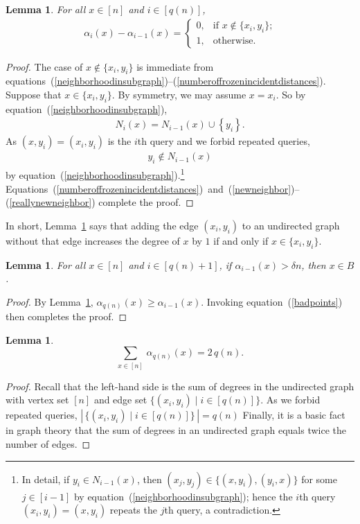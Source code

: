 \documentclass[letterpaper,12pt]{article}
\newtheorem{lemma}[theorem]{Lemma}
\begin{document}
\begin{lemma}\label{monotonicity}
For all $x\in[n]$ and $i\in[q(n)]$,
\begin{eqnarray*}
\alpha_i(x)-\alpha_{i-1}(x)
=\left\{
\begin{array}{ll}
0, &\text{if $x\notin \{x_i,y_i\}$;}\\
1, &\text{otherwise.}
\end{array}
\right.
\end{eqnarray*}
\end{lemma}
\begin{proof}
The case of $x\notin \{x_i,y_i\}$ is immediate from
equations~(\ref{neighborhoodinsubgraph})--(\ref{numberoffrozenincidentdistances}).
Suppose that $x\in \{x_i,y_i\}$.
By symmetry,
we may assume
$x=x_i$.
So by equation~(\ref{neighborhoodinsubgraph}),
\begin{eqnarray}
N_i(x)=N_{i-1}(x)\cup\left\{y_i\right\}.\label{newneighbor}
\end{eqnarray}
As
$(x,y_i)=(x_i,y_i)$ is the $i$th query
and we
forbid
repeated
queries,
\begin{eqnarray}
y_i\notin N_{i-1}(x)\label{reallynewneighbor}
\end{eqnarray}
by equation~(\ref{neighborhoodinsubgraph}).\footnote{In detail,
if $y_i\in N_{i-1}(x)$, then
$(x_j,y_j)\in\{(x,y_i),(y_i,x)\}$
for some $j\in[i-1]$ by
equation~(\ref{neighborhoodinsubgraph}); hence the $i$th query $(x_i,y_i)
=(x,y_i)$
repeats the $j$th query, a contradiction.}
Equations~(\ref{numberoffrozenincidentdistances})~and~(\ref{newneighbor})--(\ref{reallynewneighbor})
complete the
proof.
\end{proof}

In short, Lemma~\ref{monotonicity} says that adding the edge $(x_i,y_i)$
to an undirected graph without that edge increases the degree of $x$
by $1$ if and only if $x\in\{x_i,y_i\}$.



\begin{lemma}\label{monotonicitysame}
For all $x\in[n]$ and $i\in[q(n)+1]$,
if $\alpha_{i-1}(x)>\delta n$, then
$x\in B$.
\end{lemma}
\begin{proof}
By Lemma~\ref{monotonicity}, $\alpha_{q(n)}(x)\ge \alpha_{i-1}(x)$.
Invoking equation~(\ref{badpoints}) then completes the proof.
\end{proof}

\begin{lemma}\label{sumofdegrees}
$$\sum_{x\in[n]}\, \alpha_{q(n)}(x)= 2\, q(n).$$
\end{lemma}
\begin{proof}
Recall that the left-hand side
is the sum of degrees in the undirected graph with vertex set $[n]$
and edge set $\{(x_i,y_i)\mid i\in[q(n)]\}$.
As we
forbid
repeated queries, $\left|\,\{(x_i,y_i)\mid
i\in[q(n)]\}\,\right|=q(n)$
Finally, it is a basic fact in graph
theory that
the sum of degrees in an undirected graph equals
twice the number of edges.
\end{proof}
\end{document}
